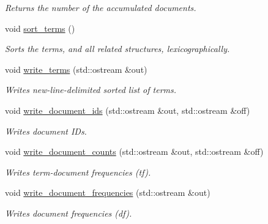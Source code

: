 \begin{DoxyCompactItemize}
\begin{DoxyCompactList}\small\item\em Returns the number of the accumulated documents. \end{DoxyCompactList}\item 
void \hyperlink{classirkit_1_1IndexBuilder_a242138da460b9853fc6aebb5b8c59c86}{sort\+\_\+terms} ()
\begin{DoxyCompactList}\small\item\em Sorts the terms, and all related structures, lexicographically. \end{DoxyCompactList}\item 
void \hyperlink{classirkit_1_1IndexBuilder_a7c81e735e585ec41a7e5e334e4416874}{write\+\_\+terms} (std\+::ostream \&out)
\begin{DoxyCompactList}\small\item\em Writes new-\/line-\/delimited sorted list of terms. \end{DoxyCompactList}\item 
void \hyperlink{classirkit_1_1IndexBuilder_af8d8c6c446a064ec7c9b2a05b522555e}{write\+\_\+document\+\_\+ids} (std\+::ostream \&out, std\+::ostream \&off)
\begin{DoxyCompactList}\small\item\em Writes document I\+Ds. \end{DoxyCompactList}\item 
void \hyperlink{classirkit_1_1IndexBuilder_aba0b947f29e491205adf3df3f862e58e}{write\+\_\+document\+\_\+counts} (std\+::ostream \&out, std\+::ostream \&off)
\begin{DoxyCompactList}\small\item\em Writes term-\/document frequencies (tf). \end{DoxyCompactList}\item 
void \hyperlink{classirkit_1_1IndexBuilder_a57c15d23588f70b78b49a6392ef61be8}{write\+\_\+document\+\_\+frequencies} (std\+::ostream \&out)
\begin{DoxyCompactList}\small\item\em Writes document frequencies (df). \end{DoxyCompactList}\end{DoxyCompactItemize}
